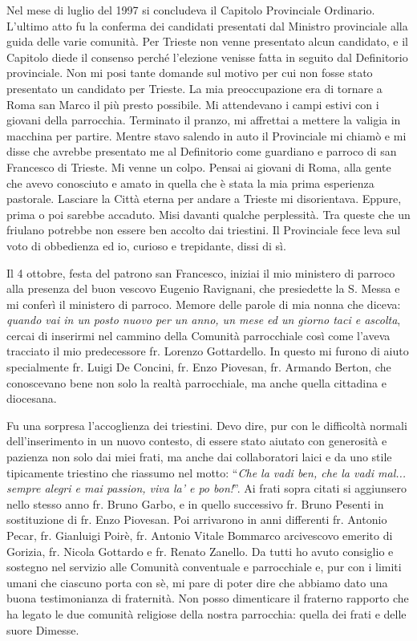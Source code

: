 \noindent Nel mese di luglio del 1997 si concludeva il Capitolo Provinciale Ordinario. L’ultimo atto fu la 
conferma dei candidati presentati dal Ministro provinciale alla guida delle varie comunità. Per 
Trieste non venne presentato alcun candidato, e il Capitolo diede il consenso perché l’elezione 
venisse fatta in seguito dal Definitorio provinciale. Non mi posi tante domande sul motivo per 
cui non fosse stato presentato un candidato per Trieste. La mia preoccupazione era di tornare a 
Roma san Marco il più presto possibile. Mi attendevano i campi estivi con i giovani della 
parrocchia. Terminato il pranzo, mi affrettai a mettere la valigia in macchina per partire. Mentre 
stavo salendo in auto il Provinciale mi chiamò e mi disse che avrebbe presentato me al 
Definitorio come guardiano e parroco di san Francesco di Trieste. Mi venne un colpo. Pensai ai 
giovani di Roma, alla gente che avevo conosciuto e amato in quella che è stata la mia prima 
esperienza pastorale. Lasciare la Città eterna per andare a Trieste mi disorientava. Eppure, prima 
o poi sarebbe accaduto. Misi davanti qualche perplessità. Tra queste che un friulano potrebbe 
non essere ben accolto dai triestini. Il Provinciale fece leva sul voto di obbedienza ed io, curioso 
e trepidante, dissi di sì.

Il 4 ottobre, festa del patrono san Francesco, iniziai il mio ministero di parroco alla presenza del 
buon vescovo Eugenio Ravignani, che presiedette la S. Messa e mi conferì il ministero di 
parroco.
\medbreak
Memore delle parole di mia nonna che diceva: \textit{quando vai in un posto nuovo per un anno, un
mese ed un giorno taci e ascolta}, cercai di inserirmi nel cammino della Comunità parrocchiale
così come l’aveva tracciato il mio predecessore fr. Lorenzo Gottardello. In questo mi furono di 
aiuto specialmente fr. Luigi De Concini, fr. Enzo Piovesan, fr. Armando Berton, che 
conoscevano bene non solo la realtà parrocchiale, ma anche quella cittadina e diocesana.

Fu una sorpresa l’accoglienza dei triestini. Devo dire, pur con le difficoltà normali 
dell’inserimento in un nuovo contesto, di essere stato aiutato con generosità e pazienza non solo 
dai miei frati, ma anche dai collaboratori laici e da uno stile tipicamente triestino che riassumo 
nel motto: \enquote{\textit{Che la vadi ben, che la vadi mal... sempre alegri e mai passion, viva la' e po bon!}}.
Ai frati sopra citati si aggiunsero nello stesso anno fr. Bruno Garbo, e in quello successivo fr. 
Bruno Pesenti in sostituzione di fr. Enzo Piovesan. Poi arrivarono in anni differenti fr. Antonio 
Pecar, fr. Gianluigi Poirè, fr. Antonio Vitale Bommarco arcivescovo emerito di Gorizia, fr. 
Nicola Gottardo e fr. Renato Zanello. Da tutti ho avuto consiglio e sostegno nel servizio alle 
Comunità conventuale e parrocchiale e, pur con i limiti umani che ciascuno porta con sè, mi pare 
di poter dire che abbiamo dato una buona testimonianza di fraternità.
\medbreak
Non posso dimenticare il fraterno rapporto che ha legato le due comunità religiose della nostra 
parrocchia: quella dei frati e delle suore Dimesse.

